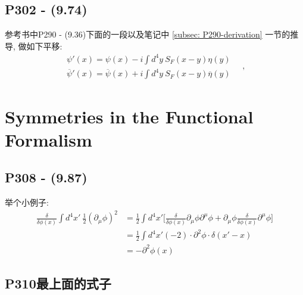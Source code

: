 \subsection{P302 - (9.74)}
参考书中P290 - (9.36)下面的一段以及笔记中 \ref{subsec: P290-derivation} 一节的推导, 做如下平移:
\begin{equation}
  \begin{gathered}
    \psi'(x) = \psi(x) - i\int d^4y\ S_F(x-y) \eta(y) \\
    \overline{\psi}'(x) = \overline{\psi}(x) + i\int d^4y\ S_F(x-y) \overline{\eta}(y)
  \end{gathered}\quad,
\end{equation}

\section{Symmetries in the Functional Formalism}

\subsection{P308 - (9.87)}
举个小例子:
\begin{equation}
  \begin{aligned}
    \frac{\delta}{\delta \phi(x)}\int d^4x'\ \tfrac{1}{2} (\partial_\mu \phi)^2 & = \frac{1}{2} \int d^4x' \biggl[\frac{\delta}{\delta \phi(x)} \partial_\mu \phi \partial^\mu \phi + \partial_\mu \phi \frac{\delta}{\delta \phi(x)} \partial^\mu \phi\biggr] \\
                                                                                & = \frac{1}{2} \int d^4 x' (-2)\cdot \partial^2\phi \cdot \delta(x'-x)                                                                                                        \\
                                                                                & = -\partial^2\phi(x)
  \end{aligned}
\end{equation}

\subsection{P310最上面的式子}
